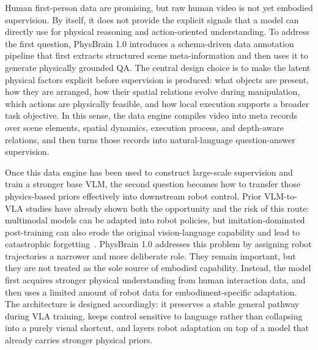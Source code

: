Human first-person data are promising, but raw human video is not yet embodied supervision. By itself, it does not provide the explicit signals that a model can directly use for physical reasoning and action-oriented understanding. To address the first question, PhysBrain 1.0 introduces a schema-driven data annotation pipeline that first extracts structured scene meta-information and then uses it to generate physically grounded QA. The central design choice is to make the latent physical factors explicit before supervision is produced: what objects are present, how they are arranged, how their spatial relations evolve during manipulation, which actions are physically feasible, and how local execution supports a broader task objective. In this sense, the data engine compiles video into meta records over scene elements, spatial dynamics, execution process, and depth-aware relations, and then turns those records into natural-language question-answer supervision.

Once this data engine has been used to construct large-scale supervision and train a stronger base VLM, the second question becomes how to transfer those physics-based priors effectively into downstream robot control. Prior VLM-to-VLA studies have already shown both the opportunity and the risk of this route: multimodal models can be adapted into robot policies, but imitation-dominated post-training can also erode the original vision-language capability and lead to catastrophic forgetting~\cite{ChatVLA2_2025_arXiv,VLM2VLA_2025_arXiv,TwinBrainVLA_2026_arXiv}. PhysBrain 1.0 addresses this problem by assigning robot trajectories a narrower and more deliberate role. They remain important, but they are not treated as the sole source of embodied capability. Instead, the model first acquires stronger physical understanding from human interaction data, and then uses a limited amount of robot data for embodiment-specific adaptation. The architecture is designed accordingly: it preserves a stable general pathway during VLA training, keeps control sensitive to language rather than collapsing into a purely visual shortcut, and layers robot adaptation on top of a model that already carries stronger physical priors.

